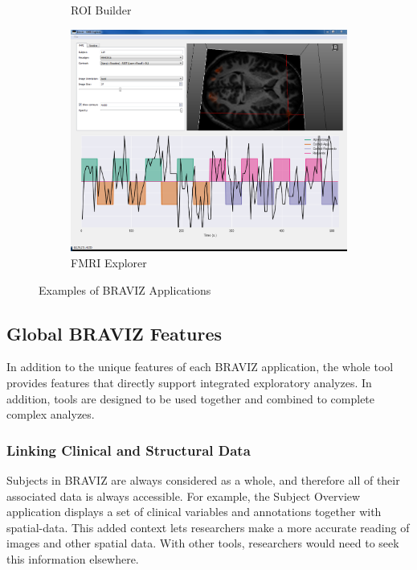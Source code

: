 \documentclass[twocolumn]{svjour3}
\begin{document}
\begin{figure}
\begin{center}
\begin{subfigure}[b]{0.22\linewidth}
\caption{ROI Builder\label{fig_roi}}
\end{subfigure}\hfill
\begin{subfigure}[b]{0.18\linewidth}
\includegraphics[width=\textwidth]{fmri}
\caption{FMRI Explorer\label{fig_fmri}}
\end{subfigure}
\end{center}
 \caption{\label{fig_other_apps} Examples of BRAVIZ Applications}
\end{figure}



\subsection{Global BRAVIZ Features}

In addition to the unique features of each BRAVIZ application, the whole tool provides features that directly support integrated exploratory analyzes. In addition, tools are designed to be used together and combined to complete complex analyzes.

\subsubsection{Linking Clinical and Structural Data}

Subjects in BRAVIZ are always considered as a whole, and therefore all of their associated data is always accessible. For example, the Subject Overview application displays a set of clinical variables and annotations together with spatial-data. This added context lets researchers make a more accurate reading of images and other spatial data. With other tools, researchers would need to seek this information elsewhere. 
\end{document}
